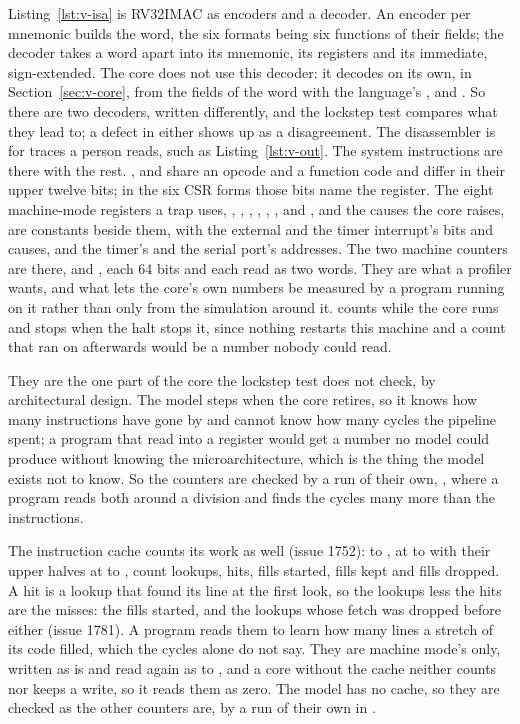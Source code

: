 \documentclass[journal,onecolumn,9pt]{IEEEtran}
\begin{document}
Listing~\ref{lst:v-isa} is RV32IMAC as encoders and a decoder. An
encoder per mnemonic builds the word, the six formats being six
functions of their fields; the decoder takes a word apart into its
mnemonic, its registers and its immediate, sign-extended. The core
does not use this decoder: it decodes on its own, in
Section~\ref{sec:v-core}, from the fields of the word with the
language's ,  and . So there are
two decoders, written differently, and the lockstep test compares
what they lead to; a defect in either shows up as a disagreement. The
disassembler is for traces a person reads, such as
Listing~\ref{lst:v-out}. The system instructions are there with the
rest. ,  and  share an opcode
and a function code and differ in their upper twelve bits; in the
six CSR forms those bits name the register. The eight machine-mode
registers a trap uses, , ,
, , , ,
 and , and the causes the core raises, are
constants beside them, with the external and the timer interrupt's
bits and causes, and the timer's and the serial port's addresses.
The two machine counters are there,  and
, each 64 bits and each read as two words. They are
what a profiler wants, and what lets the core's own numbers be
measured by a program running on it rather than only from the
simulation around it.  counts while the core runs and
stops when the halt stops it, since nothing restarts this machine and
a count that ran on afterwards would be a number nobody could read.

They are the one part of the core the lockstep test does not check,
by architectural design. The model steps when the core
retires, so it knows how many instructions have gone by and cannot
know how many cycles the pipeline spent; a program that read
 into a register would get a number no model could
produce without knowing the microarchitecture, which is the thing the
model exists not to know. So the counters are checked by a run of
their own, , where a program reads
both around a division and finds the cycles many more than the
instructions.

The instruction cache counts its work as well (issue 1752):
 to , at  to
 with their upper halves at  to ,
count lookups, hits, fills started, fills kept and fills dropped. A
hit is a lookup that found its line at the first look, so the lookups
less the hits are the misses: the fills started, and the lookups whose
fetch was dropped before either (issue 1781). A
program reads them to learn how many lines a stretch of its code
filled, which the cycles alone do not say. They are machine mode's
only, written as  is and read again as
 to , and a core without the cache
neither counts nor keeps a write, so it reads them as zero. The model has no cache, so they are checked as the
other counters are, by a run of their own in
.
\end{document}

